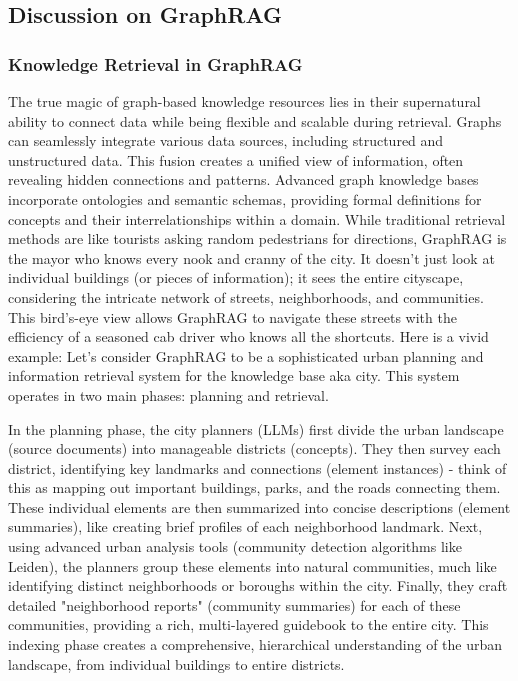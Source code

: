 \documentclass[lettersize,journal]{IEEEtran}
\begin{document}
\subsection{Discussion on GraphRAG}\label{sec:discussion}
\subsubsection{Knowledge Retrieval in GraphRAG}
The true magic of graph-based knowledge resources lies in their supernatural ability to connect data while being flexible and scalable during retrieval. Graphs can seamlessly integrate various data sources, including structured and unstructured data. This fusion creates a unified view of information, often revealing hidden connections and patterns. Advanced graph knowledge bases incorporate ontologies and semantic schemas, providing formal definitions for concepts and their interrelationships within a domain. While traditional retrieval methods are like tourists asking random pedestrians for directions, GraphRAG is the mayor who knows every nook and cranny of the city. It doesn't just look at individual buildings (or pieces of information); it sees the entire cityscape, considering the intricate network of streets, neighborhoods, and communities. This bird's-eye view allows GraphRAG to navigate these streets with the efficiency of a seasoned cab driver who knows all the shortcuts.
Here is a vivid example: Let’s consider GraphRAG to be a sophisticated urban planning and information retrieval system for the knowledge base aka city. This system operates in two main phases: planning and retrieval.

In the planning phase, the city planners (LLMs) first divide the urban landscape (source documents) into manageable districts (concepts). They then survey each district, identifying key landmarks and connections (element instances) - think of this as mapping out important buildings, parks, and the roads connecting them. These individual elements are then summarized into concise descriptions (element summaries), like creating brief profiles of each neighborhood landmark. Next, using advanced urban analysis tools (community detection algorithms like Leiden), the planners group these elements into natural communities, much like identifying distinct neighborhoods or boroughs within the city. Finally, they craft detailed "neighborhood reports" (community summaries) for each of these communities, providing a rich, multi-layered guidebook to the entire city. This indexing phase creates a comprehensive, hierarchical understanding of the urban landscape, from individual buildings to entire districts.
\end{document}
